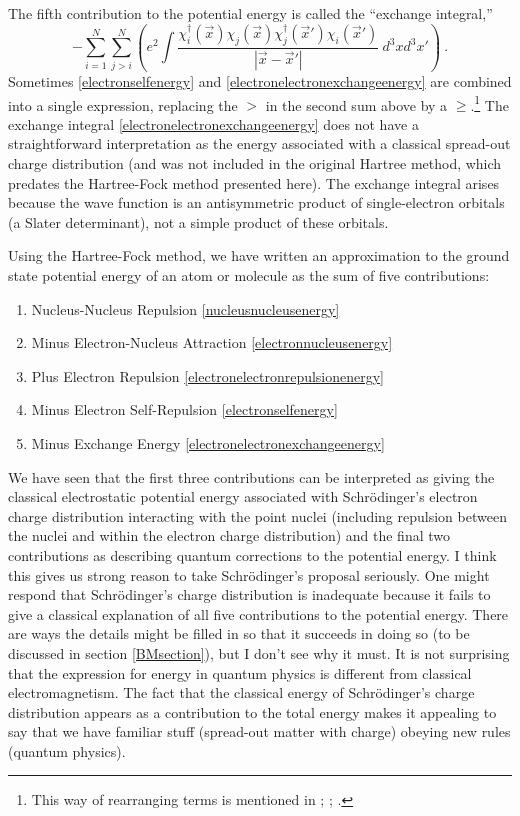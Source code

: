 \documentclass[onecolumn,secnumarabic,amsmath,amssymb,balancelastpage,nofootinbib]{article}
\begin{document}
The fifth contribution to the potential energy is called the ``exchange integral,''
\begin{equation}
-\sum_{i=1}^{N}\sum_{j>i}^{N}\left(e^2\int{\frac{\chi_i^{\dagger}(\vec{x})\chi_j(\vec{x})\chi_j^{\dagger}(\vec{x}')\chi_i(\vec{x}')}{|\vec{x}-\vec{x}'|}\  d^3 x d^3 x'}\right)
\ .
\label{electronelectronexchangeenergy}
\end{equation}
Sometimes \eqref{electronselfenergy} and \eqref{electronelectronexchangeenergy} are combined into a single expression, replacing the $>$ in the second sum above by a $\geq$.\footnote{This way of rearranging terms is mentioned in \cite[pg.\ 436]{blinder1965}; \cite[pg.\ 5048]{perdew1981}; \cite[pg.\ 7]{parryang}.}  The exchange integral \eqref{electronelectronexchangeenergy} does not have a straightforward interpretation as the energy associated with a classical spread-out charge distribution (and was not included in the original Hartree method, which predates the Hartree-Fock method presented here).  The exchange integral arises because the wave function is an antisymmetric product of single-electron orbitals (a Slater determinant), not a simple product of these orbitals.

Using the Hartree-Fock method, we have written an approximation to the ground state potential energy of an atom or molecule as the sum of five contributions:
\begin{enumerate}
\setlength\itemsep{0 pt}
\item Nucleus-Nucleus Repulsion \eqref{nucleusnucleusenergy}
\item Minus Electron-Nucleus Attraction \eqref{electronnucleusenergy}
\item Plus Electron Repulsion \eqref{electronelectronrepulsionenergy}
\item Minus Electron Self-Repulsion \eqref{electronselfenergy}
\item Minus Exchange Energy \eqref{electronelectronexchangeenergy}
\end{enumerate}
We have seen that the first three contributions can be interpreted as giving the classical electrostatic potential energy associated with Schr\"{o}dinger's electron charge distribution interacting with the point nuclei (including repulsion between the nuclei and within the electron charge distribution) and the final two contributions as describing quantum corrections to the potential energy.  I think this gives us strong reason to take Schr\"{o}dinger's proposal seriously.  One might respond that Schr\"{o}dinger's charge distribution is inadequate because it fails to give a classical explanation of all five contributions to the potential energy.  There are ways the details might be filled in so that it succeeds in doing so (to be discussed in section \ref{BMsection}), but I don't see why it must.  It is not surprising that the expression for energy in quantum physics is different from classical electromagnetism.  The fact that the classical energy of Schr\"{o}dinger's charge distribution appears as a contribution to the total energy makes it appealing to say that we have familiar stuff (spread-out matter with charge) obeying new rules (quantum physics).
\end{document}
